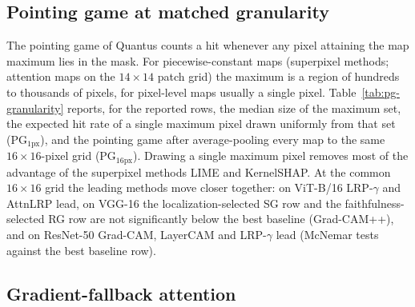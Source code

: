 \documentclass[twoside]{article}
\newcommand{\1}{\mathbf{1}}
\begin{document}
\subsection{Pointing game at matched granularity}\label{app:pg-granularity}

The pointing game of Quantus counts a hit whenever any pixel attaining the map maximum lies in the
mask. For piecewise-constant maps (superpixel methods; attention maps on the $14{\times}14$ patch
grid) the maximum is a region of hundreds to thousands of pixels, for pixel-level maps usually a
single pixel. Table~\ref{tab:pg-granularity} reports, for the reported rows, the median size of the
maximum set, the expected hit rate of a single maximum pixel drawn uniformly from that set
(PG$_{1\mathrm{px}}$), and the pointing game after average-pooling every map to the same
$16{\times}16$-pixel grid (PG$_{16\mathrm{px}}$). Drawing a single maximum pixel removes most of
the advantage of the superpixel methods LIME and KernelSHAP. At the common $16{\times}16$ grid the
leading methods move closer together: on ViT-B/16 LRP-$\gamma$ and AttnLRP lead, on VGG-16 the
localization-selected \ac{SG} row and the faithfulness-selected \ac{RG} row are not significantly
below the best baseline (Grad-CAM++), and on ResNet-50 Grad-CAM, LayerCAM and LRP-$\gamma$ lead
(McNemar tests against the best baseline row).

\begin{table}[H]
    \centering
    \caption{Pointing game under the Quantus tie rule (PG, as in the main tables) and at matched
    granularity, ImageNet-S test split. max.\ set: median number of pixels attaining the map maximum;
    PG$_{1\mathrm{px}}$: expected hit rate of one pixel drawn uniformly from that set;
    PG$_{16\mathrm{px}}$: PG after average-pooling the map to $16{\times}16$-pixel cells. Rows: the
    \texttt{loc}-selected or fixed configuration of every method, plus the \texttt{faith} rows of our
    games. \textbf{Bold}: best per model and column.}
    \label{tab:pg-granularity}
    \small
\end{table}

\subsection{Gradient-fallback attention}\label{app:abl-gradient-fallback}
\end{document}
